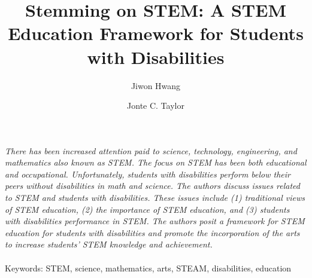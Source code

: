 \documentclass[11.5pt]{sig-alternate} %
\makeatletter
\let\oldabstract\abstract
\let\oldendabstract\endabstract
\renewenvironment{abstract} %
{\renewenvironment{quotation}%
               {\list{}{\addtolength{\leftmargin}{1em} %
                        \listparindent 1.5em%
                        \itemindent    \listparindent%
                        \rightmargin   \leftmargin%
                        \parsep        \z@ \@plus\p@}%
                \item\relax}%
               {\endlist}%
\oldabstract}
{\oldendabstract}
\makeatother
\begin{document}
\title{Stemming on STEM: A STEM Education Framework for Students with Disabilities}

\author[1]{\large \color{blue}Jiwon Hwang}
\author[2]{\large \color{blue}Jonte C. Taylor}


\toappear{}
\maketitle
\begin{@twocolumnfalse} 
\begin{abstract}
\item 
\textit{There has been increased attention paid to science, technology, engineering, and mathematics also known as STEM. The focus on STEM has been both educational and occupational. Unfortunately, students with disabilities perform below their peers without disabilities in math and science. The authors discuss issues related to STEM and students with disabilities. These issues include (1) traditional views of STEM education, (2) the importance of STEM education, and (3) students with disabilities performance in STEM. The authors posit a framework for STEM education for students with disabilities and promote the incorporation of the arts to increase students’ STEM knowledge and achievement.}
\\ \\
Keywords: STEM, science, mathematics, arts, STEAM, disabilities, education
\end{abstract}
\end{@twocolumnfalse}

\end{document}
